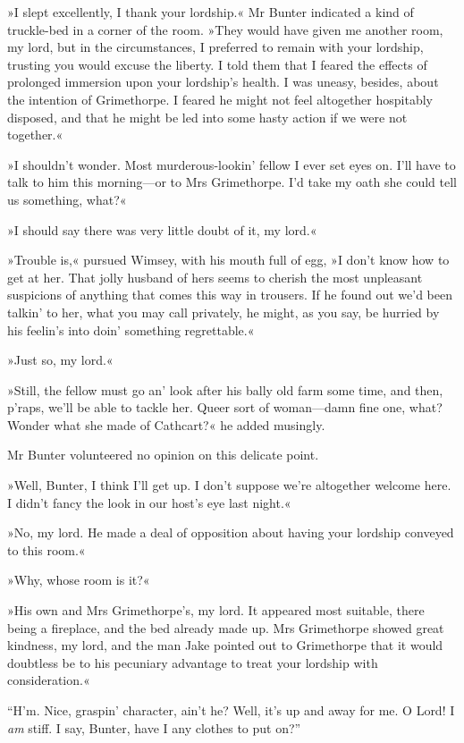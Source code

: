 »I slept excellently, I thank your lordship.« Mr Bunter indicated a kind of truckle-bed in a corner of the room. »They would have given me another room, my lord, but in the circumstances, I preferred to remain with your lordship, trusting you would excuse the liberty. I told them that I feared the effects of prolonged immersion upon your lordship's health. I was uneasy, besides, about the intention of Grimethorpe. I feared he might not feel altogether hospitably disposed, and that he might be led into some hasty action if we were not together.«

»I shouldn't wonder. Most murderous-lookin' fellow I ever set eyes on.  I'll have to talk to him this morning—or to Mrs Grimethorpe. I'd take my oath she could tell us something, what?«

»I should say there was very little doubt of it, my lord.«

»Trouble is,« pursued Wimsey, with his mouth full of egg, »I don't know how to get at her. That jolly husband of hers seems to cherish the most unpleasant suspicions of anything that comes this way in trousers. If he found out we'd been talkin' to her, what you may call privately, he might, as you say, be hurried by his feelin's into doin' something regrettable.«

»Just so, my lord.«

»Still, the fellow must go an' look after his bally old farm some time, and then, p'raps, we'll be able to tackle her. Queer sort of woman—damn fine one, what? Wonder what she made of Cathcart?« he added musingly.

Mr Bunter volunteered no opinion on this delicate point.

»Well, Bunter, I think I'll get up. I don't suppose we're altogether welcome here. I didn't fancy the look in our host's eye last night.«

»No, my lord. He made a deal of opposition about having your lordship conveyed to this room.«

»Why, whose room is it?«

»His own and Mrs Grimethorpe's, my lord. It appeared most suitable, there being a fireplace, and the bed already made up. Mrs Grimethorpe showed great kindness, my lord, and the man Jake pointed out to Grimethorpe that it would doubtless be to his pecuniary advantage to treat your lordship with consideration.«

\enquote{H'm. Nice, graspin' character, ain't he? Well, it's up and away for me. O Lord! I \textit{am} stiff. I say, Bunter, have I any clothes to put on?}

